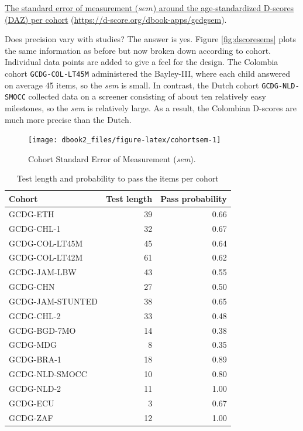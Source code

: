 \documentclass[
]{book}
\begin{document}
\label{fig:dscoresems}\href{https://d-score.org/dbook-apps/gcdgsem/\#display=by_cohort\&nrow=1\&ncol=1\&arr=row\&pg=6\&labels=cohort\&sort=cohort;asc\&filter=\&sidebar=\&fv=}{The standard error of measurement (\(sem\)) around the age-standardized D-scores (DAZ) per cohort} (\url{https://d-score.org/dbook-apps/gcdgsem}).



Does precision vary with studies? The answer is yes. Figure \ref{fig:dscoresems} plots the same information as before but now broken down according to cohort. Individual data points are added to give a feel for the design. The Colombia cohort \texttt{GCDG-COL-LT45M} administered the Bayley-III, where each child answered on average 45 items, so the \emph{sem} is small. In contrast, the Dutch cohort \texttt{GCDG-NLD-SMOCC} collected data on a screener consisting of about ten relatively easy milestones, so the \emph{sem} is relatively large. As a result, the Colombian D-scores are much more precise than the Dutch.

\begin{figure}

{\centering \texttt{[image: dbook2\_files/figure-latex/cohortsem-1]} 

}

\caption{Cohort Standard Error of Measurement (\emph{sem}).}\label{fig:cohortsem}
\end{figure}



\begin{table}

\caption{\label{tab:npsem}Test length and probability to pass the items per cohort}
\centering
\begin{tabular}[t]{lrr}
\toprule
Cohort & Test length & Pass probability\\
\midrule
GCDG-ETH & 39 & 0.66\\
GCDG-CHL-1 & 32 & 0.67\\
GCDG-COL-LT45M & 45 & 0.64\\
GCDG-COL-LT42M & 61 & 0.62\\
GCDG-JAM-LBW & 43 & 0.55\\
\addlinespace
GCDG-CHN & 27 & 0.50\\
GCDG-JAM-STUNTED & 38 & 0.65\\
GCDG-CHL-2 & 33 & 0.48\\
GCDG-BGD-7MO & 14 & 0.38\\
GCDG-MDG & 8 & 0.35\\
\addlinespace
GCDG-BRA-1 & 18 & 0.89\\
GCDG-NLD-SMOCC & 10 & 0.80\\
GCDG-NLD-2 & 11 & 1.00\\
GCDG-ECU & 3 & 0.67\\
GCDG-ZAF & 12 & 1.00\\
\bottomrule
\end{tabular}
\end{table}
\end{document}
